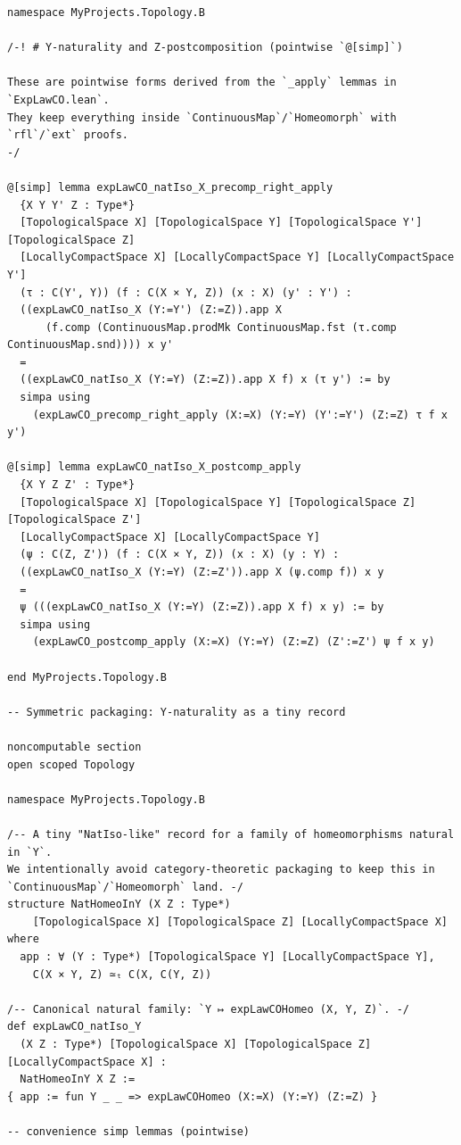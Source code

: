 \documentclass[12pt]{article}
\theoremstyle{definition}
\begin{document}
\begin{lstlisting}
namespace MyProjects.Topology.B

/-! # Y-naturality and Z-postcomposition (pointwise `@[simp]`)

These are pointwise forms derived from the `_apply` lemmas in `ExpLawCO.lean`.
They keep everything inside `ContinuousMap`/`Homeomorph` with `rfl`/`ext` proofs.
-/

@[simp] lemma expLawCO_natIso_X_precomp_right_apply
  {X Y Y' Z : Type*}
  [TopologicalSpace X] [TopologicalSpace Y] [TopologicalSpace Y'] [TopologicalSpace Z]
  [LocallyCompactSpace X] [LocallyCompactSpace Y] [LocallyCompactSpace Y']
  (τ : C(Y', Y)) (f : C(X × Y, Z)) (x : X) (y' : Y') :
  ((expLawCO_natIso_X (Y:=Y') (Z:=Z)).app X
      (f.comp (ContinuousMap.prodMk ContinuousMap.fst (τ.comp ContinuousMap.snd)))) x y'
  =
  ((expLawCO_natIso_X (Y:=Y) (Z:=Z)).app X f) x (τ y') := by
  simpa using
    (expLawCO_precomp_right_apply (X:=X) (Y:=Y) (Y':=Y') (Z:=Z) τ f x y')

@[simp] lemma expLawCO_natIso_X_postcomp_apply
  {X Y Z Z' : Type*}
  [TopologicalSpace X] [TopologicalSpace Y] [TopologicalSpace Z] [TopologicalSpace Z']
  [LocallyCompactSpace X] [LocallyCompactSpace Y]
  (ψ : C(Z, Z')) (f : C(X × Y, Z)) (x : X) (y : Y) :
  ((expLawCO_natIso_X (Y:=Y) (Z:=Z')).app X (ψ.comp f)) x y
  =
  ψ (((expLawCO_natIso_X (Y:=Y) (Z:=Z)).app X f) x y) := by
  simpa using
    (expLawCO_postcomp_apply (X:=X) (Y:=Y) (Z:=Z) (Z':=Z') ψ f x y)

end MyProjects.Topology.B

-- Symmetric packaging: Y‑naturality as a tiny record

noncomputable section
open scoped Topology

namespace MyProjects.Topology.B

/-- A tiny "NatIso-like" record for a family of homeomorphisms natural in `Y`.
We intentionally avoid category-theoretic packaging to keep this in
`ContinuousMap`/`Homeomorph` land. -/
structure NatHomeoInY (X Z : Type*)
    [TopologicalSpace X] [TopologicalSpace Z] [LocallyCompactSpace X] where
  app : ∀ (Y : Type*) [TopologicalSpace Y] [LocallyCompactSpace Y],
    C(X × Y, Z) ≃ₜ C(X, C(Y, Z))

/-- Canonical natural family: `Y ↦ expLawCOHomeo (X, Y, Z)`. -/
def expLawCO_natIso_Y
  (X Z : Type*) [TopologicalSpace X] [TopologicalSpace Z] [LocallyCompactSpace X] :
  NatHomeoInY X Z :=
{ app := fun Y _ _ => expLawCOHomeo (X:=X) (Y:=Y) (Z:=Z) }

-- convenience simp lemmas (pointwise)


\end{lstlisting}
\end{document}
